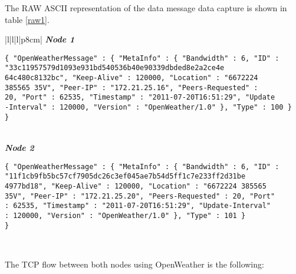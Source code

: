 The RAW \gls{ASCII} representation of the data message data capture is shown in table \ref{raw1}.

\begin{table}[H]
\centering
\begin{tabular}{|l|l|l|p{8cm}|}
\hline    
\textbf{\emph{Node 1}}\\
\hline
\begin{minipage}[t]{\linewidth}
\begin{verbatim}
{ "OpenWeatherMessage" : { "MetaInfo" : { "Bandwidth" : 6, "ID" :
"33c11957579d1093e931bd540536b40e90339dbded8e2a2ce4e
64c480c8132bc", "Keep-Alive" : 120000, "Location" : "6672224
385565 35V", "Peer-IP" : "172.21.25.16", "Peers-Requested" : 
20, "Port" : 62535, "Timestamp" : "2011-07-20T16:51:29", "Update
-Interval" : 120000, "Version" : "OpenWeather/1.0" }, "Type" : 100 } 
}

\end{verbatim}
\end{minipage} \\
\hline    
\textbf{\emph{Node 2}}\\
\hline
\begin{minipage}[t]{\linewidth}
\begin{verbatim}
{ "OpenWeatherMessage" : { "MetaInfo" : { "Bandwidth" : 6, "ID" : 
"11f1cb9fb5bc57cf7905dc26c3ef045ae7b54d5ff1c7e233ff2d31be
4977bd18", "Keep-Alive" : 120000, "Location" : "6672224 385565
35V", "Peer-IP" : "172.21.25.20", "Peers-Requested" : 20, "Port" 
: 62535, "Timestamp" : "2011-07-20T16:51:29", "Update-Interval" 
: 120000, "Version" : "OpenWeather/1.0" }, "Type" : 101 } 
}
\end{verbatim}
\end{minipage} \\
\hline
\end{tabular}
\caption{Data messages transmitted between \emph{Node 1} and \emph{Node 2}.}
\label{raw1}
\end{table}

The \gls{TCP} flow between both nodes using OpenWeather is the following:

